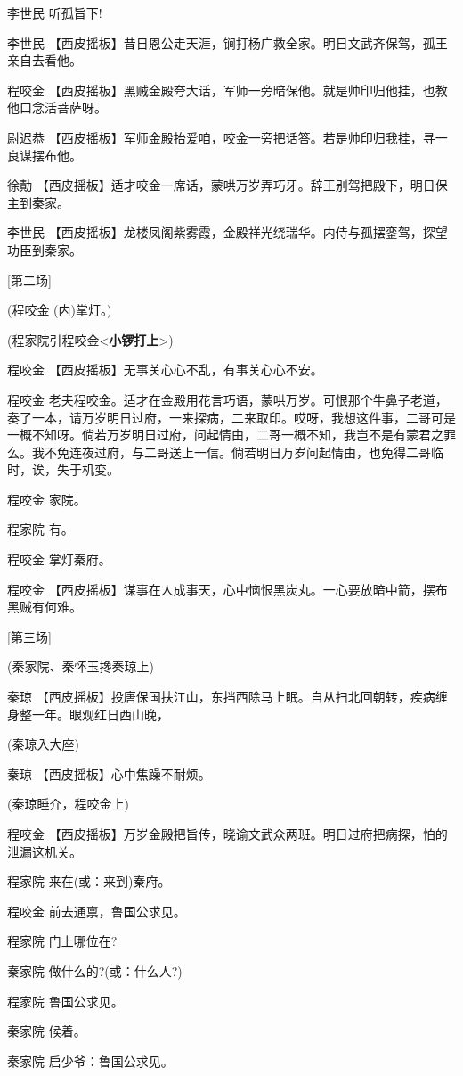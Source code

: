 李世民 听孤旨下!

李世民
【西皮摇板】昔日恩公走天涯，锏打杨广救全家。明日文武齐保驾，孤王亲自去看他。

程咬金
【西皮摇板】黑贼金殿夸大话，军师一旁暗保他。就是帅印归他挂，也教他口念活菩萨呀。

尉迟恭
【西皮摇板】军师金殿抬爱咱，咬金一旁把话答。若是帅印归我挂，寻一良谋摆布他。

徐勣
【西皮摇板】适才咬金一席话，蒙哄万岁弄巧牙。辞王别驾把殿下，明日保主到秦家。

李世民
【西皮摇板】龙楼凤阁紫雾霞，金殿祥光绕瑞华。内侍与孤摆銮驾，探望功臣到秦家。

{[}第二场{]}

(程咬金 (内)掌灯。)

(程家院引程咬金\textless{}\textbf{小锣打上}\textgreater{})

程咬金 【西皮摇板】无事关心心不乱，有事关心心不安。

程咬金
老夫程咬金。适才在金殿用花言巧语，蒙哄万岁。可恨那个牛鼻子老道，奏了一本，请万岁明日过府，一来探病，二来取印。哎呀，我想这件事，二哥可是一概不知呀。倘若万岁明日过府，问起情由，二哥一概不知，我岂不是有蒙君之罪么。我不免连夜过府，与二哥送上一信。倘若明日万岁问起情由，也免得二哥临时，诶，失于机变。

程咬金 家院。

程家院 有。

程咬金 掌灯秦府。

程咬金
【西皮摇板】谋事在人成事天，心中恼恨黑炭丸。一心要放暗中箭，摆布黑贼有何难。

{[}第三场{]}

(秦家院、秦怀玉搀秦琼上)

秦琼
【西皮摇板】投唐保国扶江山，东挡西除马上眠。自从扫北回朝转，疾病缠身整一年。眼观红日西山晚，

(秦琼入大座)

秦琼 【西皮摇板】心中焦躁不耐烦。

(秦琼睡介，程咬金上)

程咬金
【西皮摇板】万岁金殿把旨传，晓谕文武众两班。明日过府把病探，怕的泄漏这机关。

程家院 来在(或：来到)秦府。

程咬金 前去通禀，鲁国公求见。

程家院 门上哪位在?

秦家院 做什么的?(或：什么人?)

程家院 鲁国公求见。

秦家院 候着。

秦家院 启少爷：鲁国公求见。

